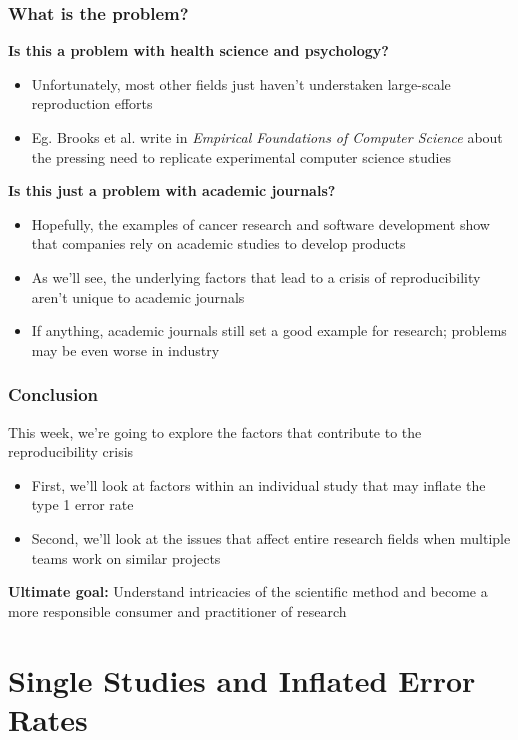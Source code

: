 \documentclass[10pt, block=fill]{beamer}
\begin{document}
\begin{frame}
  \frametitle{What is the problem?}
  
  \textbf{Is this a problem with health science and psychology?}
  \begin{itemize}
      \item Unfortunately, most other fields just haven't understaken large-scale reproduction efforts
      \item Eg. Brooks et al. write in \textit{Empirical Foundations of Computer Science} about the pressing need to replicate experimental computer science studies
  \end{itemize}
  
  \textbf{Is this just a problem with academic journals?}
  \begin{itemize}
      \item Hopefully, the examples of cancer research and software development show that companies rely on academic studies to develop products
      \item As we'll see, the underlying factors that lead to a crisis of reproducibility aren't unique to academic journals
      \item If anything, academic journals still set a good example for research; problems may be even worse in industry
  \end{itemize}
    
\end{frame}


\begin{frame}
  \frametitle{Conclusion}

This week, we're going to explore the factors that contribute to the reproducibility crisis

  \begin{itemize}
    \item First, we'll look at factors within an individual study that may inflate the type 1 error rate
    \item Second, we'll look at the issues that affect entire research fields when multiple teams work on similar projects
  \end{itemize}
  
  \textbf{Ultimate goal:} Understand intricacies of the scientific method and become a more responsible consumer and practitioner of research
\end{frame}



\section{Single Studies and Inflated Error Rates}
\end{document}
